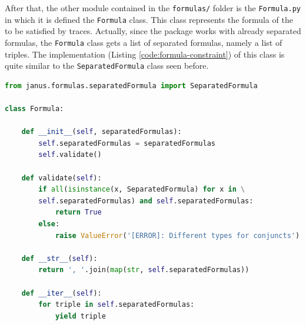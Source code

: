 After that, the other module contained in the \texttt{formulas/} folder is the \texttt{Formula.py} in which it is defined the \texttt{Formula} class. This class represents the formula of the \rcon\xspace to be satisfied by traces. Actually, since the \janus package works with already separated formulas, the \texttt{Formula} class gets a list of separated formulas, namely a list of triples. The implementation (Listing \ref{code:formula-constraint}) of this class is quite similar to the \texttt{SeparatedFormula} class seen before.
\begin{lstlisting}[language=Python, style=Python, escapechar = £, label={code:formula-constraint}, caption={The \texttt{Formula.py} module}]
from janus.formulas.separatedFormula import SeparatedFormula

class Formula:

    def __init__(self, separatedFormulas):
        self.separatedFormulas = separatedFormulas
        self.validate()

    def validate(self):
        if all(isinstance(x, SeparatedFormula) for x in \
        self.separatedFormulas) and self.separatedFormulas:
            return True
        else:
            raise ValueError('[ERROR]: Different types for conjuncts')

    def __str__(self):
        return ', '.join(map(str, self.separatedFormulas))

    def __iter__(self):
        for triple in self.separatedFormulas:
            yield triple
\end{lstlisting}
